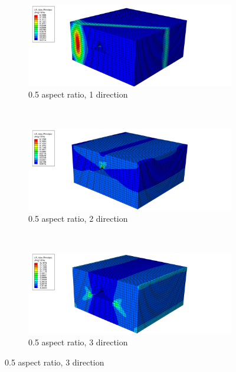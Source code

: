 \begin{figure}
   \begin{subfigure}[b]{0.70\textwidth}
    \includegraphics[width=\textwidth]{appendix_b/figures/05p1.png}
    \caption{0.5 aspect ratio, 1 direction}
  \end{subfigure}
  \\
    \begin{subfigure}[b]{0.70\textwidth}
    \includegraphics[width=\textwidth]{appendix_b/figures/05p2.png}
    \caption{0.5 aspect ratio, 2 direction}
  \end{subfigure}
  \\
  \begin{subfigure}[b]{0.70\textwidth}
    \includegraphics[width=\textwidth]{appendix_b/figures/05p3.png}
    \caption{0.5 aspect ratio, 3 direction}
  \end{subfigure}
\end{figure}
\\
